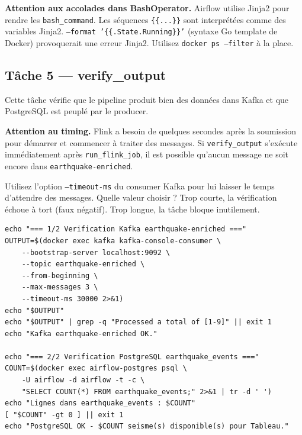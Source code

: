 \documentclass[12pt,a4paper]{article}
\begin{document}
\begin{warningbox}
  \textbf{Attention aux accolades dans BashOperator.}
  Airflow utilise Jinja2 pour rendre les \texttt{bash\_command}.
  Les séquences \texttt{\{\{...\}\}} sont interprétées comme des variables Jinja2.
  \texttt{--format '\{\{.State.Running\}\}'} (syntaxe Go template de Docker) provoquerait
  une erreur Jinja2. Utilisez \texttt{docker ps --filter} à la place.
\end{warningbox}

\subsection{Tâche 5 --- verify\_output}

Cette tâche vérifie que le pipeline produit bien des données dans Kafka
et que PostgreSQL est peuplé par le producer.

\begin{warningbox}
  \textbf{Attention au timing.}
  Flink a besoin de quelques secondes après la soumission pour démarrer
  et commencer à traiter des messages. Si \texttt{verify\_output} s'exécute
  immédiatement après \texttt{run\_flink\_job}, il est possible qu'aucun message
  ne soit encore dans \texttt{earthquake-enriched}.

  \medskip
  Utilisez l'option \texttt{--timeout-ms} du consumer Kafka pour lui laisser
  le temps d'attendre des messages. Quelle valeur choisir ?
  Trop courte, la vérification échoue à tort (faux négatif).
  Trop longue, la tâche bloque inutilement.
\end{warningbox}

\begin{lstlisting}[style=bash, caption={Vérification de bout en bout}]
echo "=== 1/2 Verification Kafka earthquake-enriched ==="
OUTPUT=$(docker exec kafka kafka-console-consumer \
    --bootstrap-server localhost:9092 \
    --topic earthquake-enriched \
    --from-beginning \
    --max-messages 3 \
    --timeout-ms 30000 2>&1)
echo "$OUTPUT"
echo "$OUTPUT" | grep -q "Processed a total of [1-9]" || exit 1
echo "Kafka earthquake-enriched OK."

echo "=== 2/2 Verification PostgreSQL earthquake_events ==="
COUNT=$(docker exec airflow-postgres psql \
    -U airflow -d airflow -t -c \
    "SELECT COUNT(*) FROM earthquake_events;" 2>&1 | tr -d ' ')
echo "Lignes dans earthquake_events : $COUNT"
[ "$COUNT" -gt 0 ] || exit 1
echo "PostgreSQL OK - $COUNT seisme(s) disponible(s) pour Tableau."
\end{lstlisting}
\end{document}
